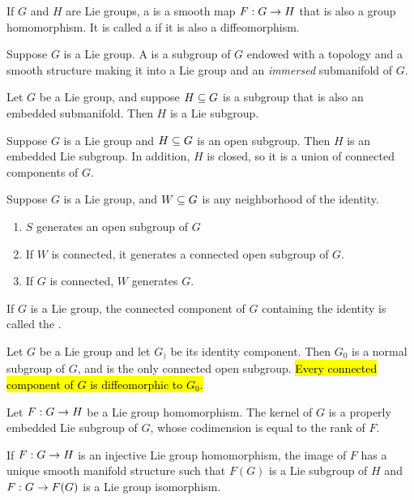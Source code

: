 \dfn If $G$ and $H$ are Lie groups, a  is a smooth map $F:G\rightarrow H$ that is also a group homomorphism. It is called a  if it is also a diffeomorphism.

\setcounter{thm}{4}

\begin{thm}
\end{thm}

\dfn Suppose $G$ is a Lie group. A  is a subgroup of $G$ endowed with a topology and a smooth structure making it into a Lie group and an \textit{immersed} submanifold of $G$.

\setcounter{thm}{10}

\begin{prop}
Let $G$ be a Lie group, and suppose $H\subseteq G$ is a subgroup that is also an embedded submanifold. Then $H$ is a Lie subgroup.
\end{prop}

\begin{lem}
Suppose $G$ is a Lie group and $H\subseteq G$ is an open subgroup. Then $H$ is an embedded Lie subgroup. In addition, $H$ is closed, so it is a union of connected components of $G$.
\end{lem}

\setcounter{thm}{13}

\begin{prop}
Suppose $G$ is a Lie group, and $W\subseteq G$ is any neighborhood of the identity.
\begin{enumerate}
    \item $S$ generates an open subgroup of $G$
    \item If $W$ is connected, it generates a connected open subgroup of $G$.
    \item If $G$ is connected, $W$ generates $G$.
\end{enumerate}
\end{prop}

\dfn If $G$ is a Lie group, the connected component of $G$ containing the identity is called the .

\begin{prop}
Let $G$ be a Lie group and let $G_)$ be its identity component. Then $G_0$ is a normal subgroup of $G$, and is the only connected open subgroup. \hl{Every connected component of $G$ is diffeomorphic to $G_0$.}
\end{prop}

\begin{prop}
Let $F:G\rightarrow H$ be a Lie group homomorphism. The kernel of $G$ is a properly embedded Lie subgroup of $G$, whose codimension is equal to the rank of $F$.
\end{prop}

\begin{prop}
If $F:G\rightarrow H$ is an injective Lie group homomorphism, the image of $F$ has a unique smooth manifold structure such that $F(G)$ is a Lie subgroup of $H$ and $F:G\rightarrow F(G)$ is a Lie group isomorphism.
\end{prop}



